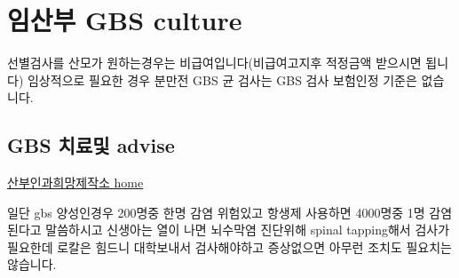 \section{임산부 GBS culture}
{
선별검사를 산모가 원하는경우는 비급여입니다(비급여고지후 적정금액 받으시면 됩니다)
임상적으로 필요한 경우 분만전 GBS 균 검사는 GBS 검사 보험인정 기준은 없습니다.}
\prezi{\clearpage}
\subsection{GBS 치료및 advise}
\href{http://www.obgydoctor.co.kr/xe/index.php?document_srl=14331&mid=m_faq}{산부인과희망제작소 home}\par
일단 gbs  양성인경우 200명중 한명  감염 위험있고 항생제 사용하면 4000명중 1명 감염된다고 말씀하시고 신생아는 열이 나면 뇌수막염 진단위해 spinal  tapping해서 검사가 필요한데 로칼은 힘드니 대학보내서 검사해야하고 증상없으면 아무런 조치도 필요치는 않습니다.
